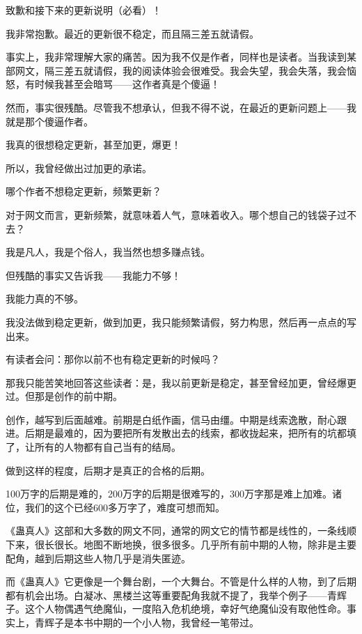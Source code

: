 \begin{this_body} \par
致歉和接下来的更新说明（必看）！

我非常抱歉。最近的更新很不稳定，而且隔三差五就请假。

事实上，我非常理解大家的痛苦。因为我不仅是作者，同样也是读者。当我读到某部网文，隔三差五就请假，我的阅读体验会很难受。我会失望，我会失落，我会恼怒，有时候我甚至会暗骂——这作者真是个傻逼！

然而，事实很残酷。尽管我不想承认，但我不得不说，在最近的更新问题上——我就是那个傻逼作者。

我真的很想稳定更新，甚至加更，爆更！

所以，我曾经做出过加更的承诺。

哪个作者不想稳定更新，频繁更新？

对于网文而言，更新频繁，就意味着人气，意味着收入。哪个想自己的钱袋子过不去？

我是凡人，我是个俗人，我当然也想多赚点钱。

但残酷的事实又告诉我——我能力不够！

我能力真的不够。

我没法做到稳定更新，做到加更，我只能频繁请假，努力构思，然后再一点点的写出来。

有读者会问：那你以前不也有稳定更新的时候吗？

那我只能苦笑地回答这些读者：是，我以前更新是稳定，甚至曾经加更，曾经爆更过。但那是创作的前中期。

创作，越写到后面越难。前期是白纸作画，信马由缰。中期是线索逸散，耐心跟进。后期是最难的，因为要把所有发散出去的线索，都收拢起来，把所有的坑都填了，让所有的人物都有自己当有的结局。

做到这样的程度，后期才是真正的合格的后期。

100万字的后期是难的，200万字的后期是很难写的，300万字那是难上加难。诸位，我们的这个已经600多万字了，难度可想而知。

《蛊真人》这部和大多数的网文不同，通常的网文它的情节都是线性的，一条线顺下来，很长很长。地图不断地换，很多很多。几乎所有前中期的人物，除非是主要配角，越到后期这些人物几乎是消失匿迹。

而《蛊真人》它更像是一个舞台剧，一个大舞台。不管是什么样的人物，到了后期都有机会出场。白凝冰、黑楼兰这等重要配角我就不提了，我举个例子——青辉子。这个人物偶遇气绝魔仙，一度陷入危机绝境，幸好气绝魔仙没有取他性命。事实上，青辉子是本书中期的一个小人物，我曾经一笔带过。


\end{this_body}
